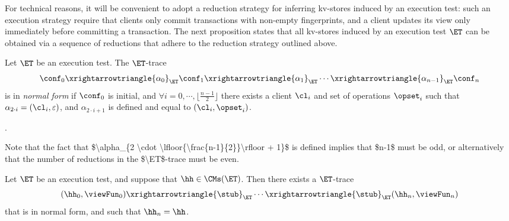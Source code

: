 For technical reasons, it will be convenient to adopt a reduction strategy for inferring kv-stores induced by an 
execution test: such an execution strategy require that clients only commit transactions with non-empty fingerprints, 
and a client updates its view only immediately before committing a transaction. 
The next proposition states that all kv-stores induced by an execution test $\ET$ can be 
obtained via a sequence of reductions that adhere to the reduction strategy outlined above. 
\begin{definition}
Let $\ET$ be an execution test. The $\ET$-trace
\[
\conf_0 \xrightarrowtriangle{\alpha_0}_{\ET} \conf_1 \xrightarrowtriangle{\alpha_1}_{\ET} \cdots \xrightarrowtriangle{\alpha_{n-1}}_{\ET} \conf_{n}
\]
is in \emph{normal form} if $\conf_0$ is initial, and 
$\forall i=0,\cdots, \lfloor\frac{n-1}{2} \rfloor$ there exists a client $\cl_i$ and set of operations $\opset_{i}$ such that 
$\alpha_{2 \cdot i} = (\cl_{i}, \varepsilon)$, and $\alpha_{2 \cdot i + 1}$ is defined and equal to $(\cl_{i}, \opset_{i})$.
\end{definition}

.

\ac{Note that the fact that $\alpha_{2 \cdot \lfloor{\frac{n-1}{2}}\rfloor + 1}$ is defined implies that $n-1$ must be odd, or alternatively that 
the number of reductions in the $\ET$-trace must be even.}

\begin{proposition}
\label{prop:et.normalform}
Let $\ET$ be an execution test, and suppose that $\hh \in \CMs(\ET)$. Then there exists a $\ET$-trace  
\[
(\hh_0, \viewFun_0) \xrightarrowtriangle{\stub}_{\ET} \cdots \xrightarrowtriangle{\stub}_{\ET} (\hh_n, \viewFun_{n})
\]
that is in normal form, and such that $\hh_{n} = \hh$.
\end{proposition}



